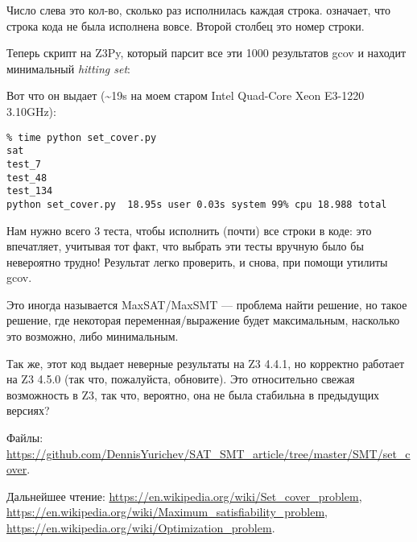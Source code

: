 Число слева это кол-во, сколько раз исполнилась каждая строка.
\TT{\#\#\#\#\#} означает, что строка кода не была исполнена вовсе.
Второй столбец это номер строки.

Теперь скрипт на Z3Py, который парсит все эти 1000 результатов gcov и находит минимальный \textit{hitting set}:



Вот что он выдает (\textasciitilde{}19s на моем старом Intel Quad-Core Xeon E3-1220 3.10GHz):

\begin{lstlisting}
% time python set_cover.py
sat
test_7
test_48
test_134
python set_cover.py  18.95s user 0.03s system 99% cpu 18.988 total
\end{lstlisting}

Нам нужно всего 3 теста, чтобы исполнить (почти) все строки в коде:
это впечатляет, учитывая тот факт, что выбрать эти тесты вручную было бы невероятно трудно!
Результат легко проверить, и снова, при помощи утилиты gcov.

Это иногда называется MaxSAT/MaxSMT --- проблема найти решение, но такое решение,
где некоторая переменная/выражение будет максимальным, насколько это возможно, либо минимальным.

Так же, этот код выдает неверные результаты на Z3 4.4.1, но корректно работает на Z3 4.5.0 (так что, пожалуйста,
обновите).
Это относительно свежая возможность в Z3, так что, вероятно, она не была стабильна в предыдущих версиях?

Файлы: \url{https://github.com/DennisYurichev/SAT_SMT_article/tree/master/SMT/set_cover}.

Дальнейшее чтение:
\url{https://en.wikipedia.org/wiki/Set_cover_problem},
\url{https://en.wikipedia.org/wiki/Maximum_satisfiability_problem},
\url{https://en.wikipedia.org/wiki/Optimization_problem}.

